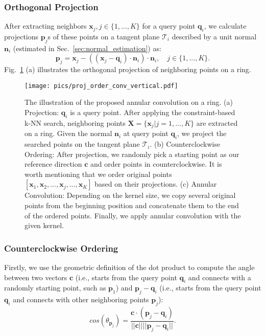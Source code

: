 \documentclass[10pt,twocolumn,letterpaper]{article}
\begin{document}
\subsubsection{Orthogonal Projection}\vspace{-1mm}
After extracting neighbors $\mathbf{x}_{j}, j\in\{1, ..., K\}$ for a query point $\mathbf{q}_i$, we calculate projections $\mathbf{p}_{j}$s of these points on a tangent plane $\mathcal{T}_i$ described by a unit normal $\mathbf{n}_i$ (estimated in Sec.~\ref{sec:normal_estimation}) as:
\begin{equation}
\mathbf{p}_{j} = \mathbf{x}_{j} - ((\mathbf{x}_{j} - \mathbf{q}_i)\cdot \mathbf{n}_i)\cdot \mathbf{n}_i, \quad  j\in\{1, ..., K\}.
\end{equation}
Fig.~\ref{fig:proj_order_conv_horiz} (a) illustrates the orthogonal projection of neighboring points on a ring.
\begin{figure}[t]
\begin{center}
  \texttt{[image: pics/proj\_order\_conv\_vertical.pdf]}\vspace{-5mm}
\end{center}
\caption{The illustration of the proposed annular convolution on a ring. (a) Projection: $\mathbf{q}_i$ is a query point. After applying the constraint-based k-NN search, neighboring points $\mathbf{X} = \{\mathbf{x}_{j}|j=1, ..., K\}$ are extracted on a ring. Given the normal $\mathbf{n}_i$ at query point $\mathbf{q}_i$, we project the searched points on the tangent plane $\mathcal{T}_i$. (b) Counterclockwise Ordering: After projection, we randomly pick a starting point as our reference direction $\mathbf{c}$ and order points in counterclockwise. It is worth mentioning that we order original points $[\mathbf{x}_1, \mathbf{x}_2, ..., \mathbf{x}_j, ..., \mathbf{x}_K]$ based on their projections. (c) Annular Convolution: Depending on the kernel size, we copy several original points from the beginning position and concatenate them to the end of the ordered points. Finally, we apply annular convolution with the given kernel.}\vspace{-5mm}
\centering
\label{fig:proj_order_conv_horiz}
\end{figure}
\vspace{-3mm}
\subsubsection{Counterclockwise Ordering}\vspace{-1mm}
Firstly, we use the geometric definition of the dot product to compute the angle between two vectors $\mathbf{c}$ (i.e., starts from the query point $\mathbf{q}_i$ and connects with a randomly starting point, such as $\mathbf{p}_1$) and $\mathbf{p}_j - \mathbf{q}_i$ (i.e., starts from the query point $\mathbf{q}_i$ and connects with other neighboring points $\mathbf{p}_j$):
\begin{equation}
cos(\theta_{\mathbf{p}_{j}}) = \frac{\mathbf{c}\cdot (\mathbf{p}_j - \mathbf{q}_i)}{||\mathbf{c}|| ||\mathbf{p}_j - \mathbf{q}_i||}.
\end{equation}
\end{document}
